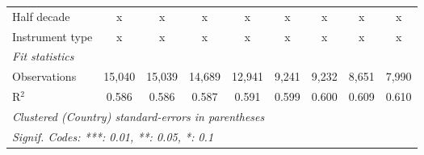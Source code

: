 \begin{tabular}{lcccccccc}
   Half decade                                                & x           & x           & x           & x           & x             & x             & x             & x\\  
   Instrument type                                            & x           & x           & x           & x           & x             & x             & x             & x\\  
   \midrule \emph{Fit statistics}\\
   Observations                                               & 15,040      & 15,039      & 14,689      & 12,941      & 9,241         & 9,232         & 8,651         & 7,990\\  
   R$^2$                                                      & 0.586       & 0.586       & 0.587       & 0.591       & 0.599         & 0.600         & 0.609         & 0.610\\  
   \midrule
   \multicolumn{9}{l}{\emph{Clustered (Country) standard-errors in parentheses}}\\
   \multicolumn{9}{l}{\emph{Signif. Codes: ***: 0.01, **: 0.05, *: 0.1}}\\
\end{tabular}
\par\endgroup


